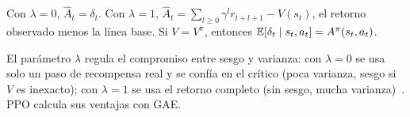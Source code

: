 \begin{proposicion}\label{prop:gae}
Con $\lambda=0$, $\widehat A_t=\delta_t$. Con $\lambda=1$, $\widehat A_t=\sum_{l\ge0}\gamma^{l}r_{t+l+1}-V(s_t)$, el retorno observado menos la línea base. Si $V=V^{\pi}$, entonces $\mathbb{E}[\delta_t\mid s_t,a_t]=A^{\pi}(s_t,a_t)$.
\end{proposicion}

El parámetro $\lambda$ regula el compromiso entre sesgo y varianza: con $\lambda=0$ se usa solo un paso de recompensa real y se confía en el crítico (poca varianza, sesgo si $V$ es inexacto); con $\lambda=1$ se usa el retorno completo (sin sesgo, mucha varianza)~\cite{cs285}. PPO calcula sus ventajas con GAE.

\addtocounter{definicion}{1}%

